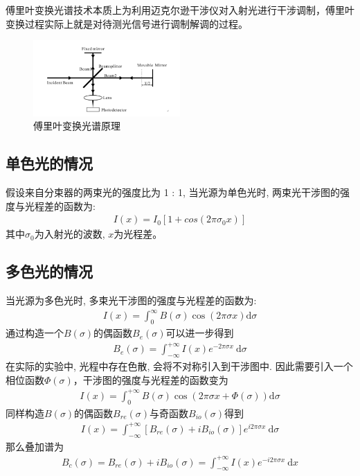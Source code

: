 \documentclass[conference]{IEEEtran}
\begin{document}
傅里叶变换光谱技术本质上为利用迈克尔逊干涉仪对入射光进行干涉调制，傅里叶变换过程实际上就是对待测光信号进行调制解调的过程。
\begin{figure}[htbp]
    \centerline{\includegraphics[width=0.5\textwidth]{pic1.PNG}}
    \caption{傅里叶变换光谱原理}
    \label{pic1}
\end{figure}

\subsection{单色光的情况}
假设来自分束器的两束光的强度比为 1 : 1, 当光源为单色光时, 两束光干涉图的强度与光程差的函数为:
\begin{align}
    I(x) = I_0\left[1 + cos (2𝜋\sigma_0 x)\right] 
\end{align}
其中$\sigma_0$为入射光的波数, $x$为光程差。

\subsection{多色光的情况}
当光源为多色光时, 多束光干涉图的强度与光程差的函数为:
\begin{align}
    I(x)=\int_{0}^{\infty} B(\sigma) \cos (2 \pi \sigma x) \mathrm{d} \sigma
\end{align}
通过构造一个$B(\sigma)$的偶函数$B_{e}(\sigma)$可以进一步得到
\begin{align}
    B_{e}(\sigma)=\int_{-\infty}^{+\infty} I(x) e^{-2 \pi \sigma x} \mathrm{~d} \sigma
\end{align}
在实际的实验中, 光程中存在色散, 会将不对称引入到干涉图中. 因此需要引入一个相位函数$\Phi(\sigma)$，干涉图的强度与光程差的函数变为
\begin{align}
    I(x)=\int_{0}^{+\infty} B(\sigma) \cos (2 \pi \sigma x+\Phi(\sigma)) \mathrm{d} \sigma
\end{align}
同样构造$B(\sigma)$的偶函数$B_{re}(\sigma)$与奇函数$B_{io}(\sigma)$得到
\begin{align*}
I(x)=\int_{-\infty}^{+\infty}\left[B_{r e}(\sigma)+i B_{i o}(\sigma)\right] e^{i 2 \pi \sigma x} \mathrm{~d} \sigma
\end{align*}
那么叠加谱为
\begin{align}
    B_{c}(\sigma)=B_{r e}(\sigma)+i B_{i o}(\sigma)=\int_{-\infty}^{+\infty} I(x) e^{-i 2 \pi \sigma x} \mathrm{~d} x 
\end{align}
\end{document}
